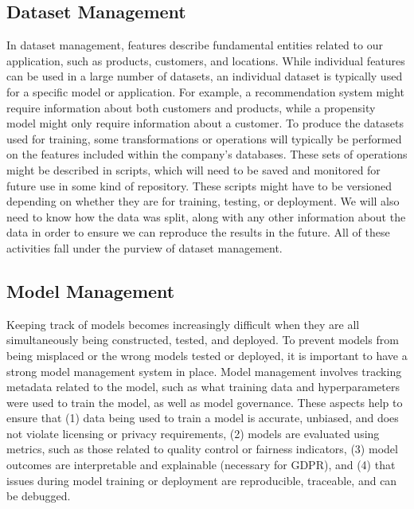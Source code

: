 {{{{{{{{    \subsection{Dataset Management}
    
    In dataset management, features describe fundamental entities related to our application, such as products, customers, and locations. While individual features can be used in a large number of datasets, an individual dataset is typically used for a specific model or application. For example, a recommendation system might require information about both customers and products, while a propensity model might only require information about a customer. To produce the datasets used for training, some transformations or operations will typically be performed on the features included within the company’s databases. These sets of operations might be described in scripts, which will need to be saved and monitored for future use in some kind of repository. These scripts might have to be versioned depending on whether they are for training, testing, or deployment. We will also need to know how the data was split, along with any other information about the data in order to ensure we can reproduce the results in the future. All of these activities fall under the purview of dataset management.
    
   \subsection{Model Management}
   
    Keeping track of models becomes increasingly difficult when they are all simultaneously being constructed, tested, and deployed. To prevent models from being misplaced or the wrong models tested or deployed, it is important to have a strong model management system in place. Model management involves tracking metadata related to the model, such as what training data and hyperparameters were used to train the model, as well as model governance. These aspects help to ensure that (1) data being used to train a model is accurate, unbiased, and does not violate licensing or privacy requirements, (2) models are evaluated using metrics, such as those related to quality control or fairness indicators, (3) model outcomes are interpretable and explainable (necessary for GDPR), and (4) that issues during model training or deployment are reproducible, traceable, and can be debugged.
    
}}}}}}}}
